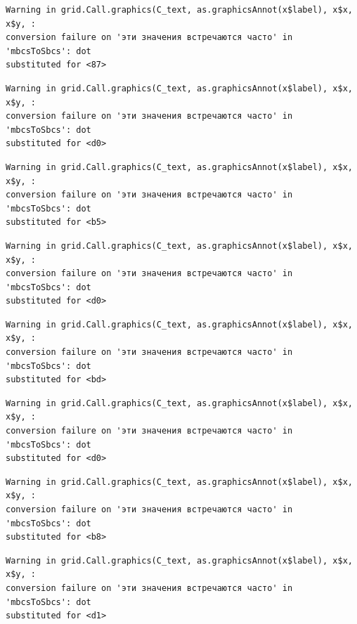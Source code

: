 \documentclass[
  letterpaper,
]{scrbook}
\theoremstyle{definition}
\theoremstyle{remark}
\begin{document}
\begin{verbatim}
Warning in grid.Call.graphics(C_text, as.graphicsAnnot(x$label), x$x, x$y, :
conversion failure on 'эти значения встречаются часто' in 'mbcsToSbcs': dot
substituted for <87>
\end{verbatim}

\begin{verbatim}
Warning in grid.Call.graphics(C_text, as.graphicsAnnot(x$label), x$x, x$y, :
conversion failure on 'эти значения встречаются часто' in 'mbcsToSbcs': dot
substituted for <d0>
\end{verbatim}

\begin{verbatim}
Warning in grid.Call.graphics(C_text, as.graphicsAnnot(x$label), x$x, x$y, :
conversion failure on 'эти значения встречаются часто' in 'mbcsToSbcs': dot
substituted for <b5>
\end{verbatim}

\begin{verbatim}
Warning in grid.Call.graphics(C_text, as.graphicsAnnot(x$label), x$x, x$y, :
conversion failure on 'эти значения встречаются часто' in 'mbcsToSbcs': dot
substituted for <d0>
\end{verbatim}

\begin{verbatim}
Warning in grid.Call.graphics(C_text, as.graphicsAnnot(x$label), x$x, x$y, :
conversion failure on 'эти значения встречаются часто' in 'mbcsToSbcs': dot
substituted for <bd>
\end{verbatim}

\begin{verbatim}
Warning in grid.Call.graphics(C_text, as.graphicsAnnot(x$label), x$x, x$y, :
conversion failure on 'эти значения встречаются часто' in 'mbcsToSbcs': dot
substituted for <d0>
\end{verbatim}

\begin{verbatim}
Warning in grid.Call.graphics(C_text, as.graphicsAnnot(x$label), x$x, x$y, :
conversion failure on 'эти значения встречаются часто' in 'mbcsToSbcs': dot
substituted for <b8>
\end{verbatim}

\begin{verbatim}
Warning in grid.Call.graphics(C_text, as.graphicsAnnot(x$label), x$x, x$y, :
conversion failure on 'эти значения встречаются часто' in 'mbcsToSbcs': dot
substituted for <d1>
\end{verbatim}
\end{document}
